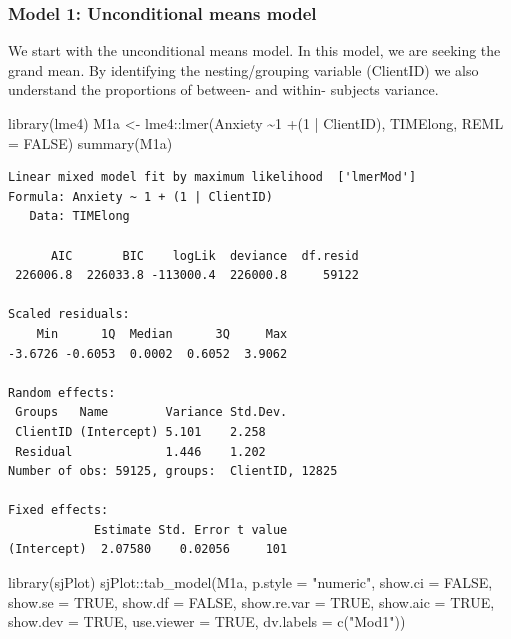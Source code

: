 \documentclass[
  11pt,
]{book}
\newenvironment{Shaded}{\begin{snugshade}}{\end{snugshade}}
\newcommand{\AttributeTok}[1]{\textcolor[rgb]{0.77,0.63,0.00}{#1}}
\newcommand{\ConstantTok}[1]{\textcolor[rgb]{0.00,0.00,0.00}{#1}}
\newcommand{\DecValTok}[1]{\textcolor[rgb]{0.00,0.00,0.81}{#1}}
\newcommand{\FunctionTok}[1]{\textcolor[rgb]{0.00,0.00,0.00}{#1}}
\newcommand{\NormalTok}[1]{#1}
\newcommand{\OtherTok}[1]{\textcolor[rgb]{0.56,0.35,0.01}{#1}}
\newcommand{\SpecialCharTok}[1]{\textcolor[rgb]{0.00,0.00,0.00}{#1}}
\newcommand{\StringTok}[1]{\textcolor[rgb]{0.31,0.60,0.02}{#1}}
\begin{document}
\hypertarget{model-1-unconditional-means-model}{%
\subsubsection{Model 1: Unconditional means model}\label{model-1-unconditional-means-model}}

We start with the unconditional means model. In this model, we are seeking the grand mean. By identifying the nesting/grouping variable (ClientID) we also understand the proportions of between- and within- subjects variance.

\begin{Shaded}
\begin{Highlighting}[]
\FunctionTok{library}\NormalTok{(lme4)}
\NormalTok{M1a }\OtherTok{\textless{}{-}}\NormalTok{ lme4}\SpecialCharTok{::}\FunctionTok{lmer}\NormalTok{(Anxiety }\SpecialCharTok{\textasciitilde{}}\DecValTok{1} \SpecialCharTok{+}\NormalTok{(}\DecValTok{1} \SpecialCharTok{|}\NormalTok{ ClientID), TIMElong, }\AttributeTok{REML =} \ConstantTok{FALSE}\NormalTok{)}
\FunctionTok{summary}\NormalTok{(M1a)}
\end{Highlighting}
\end{Shaded}

\begin{verbatim}
Linear mixed model fit by maximum likelihood  ['lmerMod']
Formula: Anxiety ~ 1 + (1 | ClientID)
   Data: TIMElong

      AIC       BIC    logLik  deviance  df.resid 
 226006.8  226033.8 -113000.4  226000.8     59122 

Scaled residuals: 
    Min      1Q  Median      3Q     Max 
-3.6726 -0.6053  0.0002  0.6052  3.9062 

Random effects:
 Groups   Name        Variance Std.Dev.
 ClientID (Intercept) 5.101    2.258   
 Residual             1.446    1.202   
Number of obs: 59125, groups:  ClientID, 12825

Fixed effects:
            Estimate Std. Error t value
(Intercept)  2.07580    0.02056     101
\end{verbatim}

\begin{Shaded}
\begin{Highlighting}[]
\FunctionTok{library}\NormalTok{(sjPlot)}
\NormalTok{sjPlot}\SpecialCharTok{::}\FunctionTok{tab\_model}\NormalTok{(M1a, }\AttributeTok{p.style =} \StringTok{"numeric"}\NormalTok{, }\AttributeTok{show.ci =} \ConstantTok{FALSE}\NormalTok{, }\AttributeTok{show.se =} \ConstantTok{TRUE}\NormalTok{, }\AttributeTok{show.df =} \ConstantTok{FALSE}\NormalTok{, }\AttributeTok{show.re.var =} \ConstantTok{TRUE}\NormalTok{, }\AttributeTok{show.aic =} \ConstantTok{TRUE}\NormalTok{, }\AttributeTok{show.dev =} \ConstantTok{TRUE}\NormalTok{, }\AttributeTok{use.viewer =} \ConstantTok{TRUE}\NormalTok{, }\AttributeTok{dv.labels =} \FunctionTok{c}\NormalTok{(}\StringTok{"Mod1"}\NormalTok{))}
\end{Highlighting}
\end{Shaded}
\end{document}
